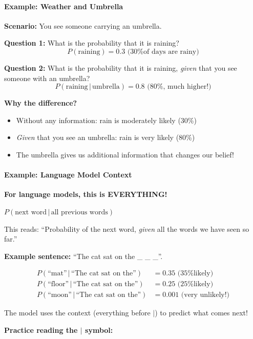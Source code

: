 \begin{chapterenv}
\paragraph{Example: Weather and Umbrella}

\textbf{Scenario:} You see someone carrying an umbrella.

\textbf{Question 1:} What is the probability that it is raining?
\[P(\text{raining}) = 0.3 \text{ (30\% of days are rainy)}\]

\textbf{Question 2:} What is the probability that it is raining, \textit{given} that you see someone with an umbrella?
\[P(\text{raining} \,|\, \text{umbrella}) = 0.8 \text{ (80\%, much higher!)}\]

\textbf{Why the difference?}
\begin{itemize}[nosep]
    \item Without any information: rain is moderately likely (30\%)
    \item \textit{Given} that you see an umbrella: rain is very likely (80\%)
    \item The umbrella gives us additional information that changes our belief!
\end{itemize}

\paragraph{Example: Language Model Context}

\textbf{For language models, this is EVERYTHING!}

$P(\text{next word} \,|\, \text{all previous words})$

This reads: ``Probability of the next word, \textit{given} all the words we have seen so far.''

\textbf{Example sentence:} ``The cat sat on the \_ \_ \_''.

\begin{align*}
P(\text{``mat''} \,|\, \text{``The cat sat on the''}) &= 0.35 \text{ (35\% likely)} \\
P(\text{``floor''} \,|\, \text{``The cat sat on the''}) &= 0.25 \text{ (25\% likely)} \\
P(\text{``moon''} \,|\, \text{``The cat sat on the''}) &= 0.001 \text{ (very unlikely!)}
\end{align*}

The model uses the context (everything before $|$) to predict what comes next!

\begin{infobox}
\textbf{Practice reading the $|$ symbol:}


\end{infobox}
\end{chapterenv}
